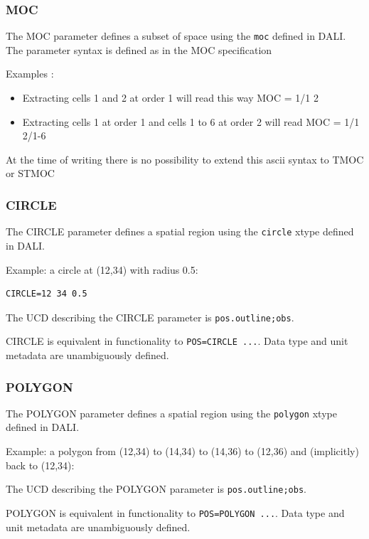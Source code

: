 \documentclass[11pt,a4paper]{ivoa}
\newcommand{\xtype}[1]{\texttt{#1}}
\newcommand{\ucd}[1]{\texttt{#1}}
\begin{document}
\subsubsection{MOC}
The MOC parameter defines a subset of space using the \xtype{moc} defined in DALI. The parameter syntax is defined as in the MOC specification \citep{MOC2}

Examples :
\begin{itemize}

\item Extracting cells 1 and 2 at order 1 will read this way MOC = 1/1 2
\item Extracting cells 1 at order 1 and cells 1 to 6 at order 2 will read MOC = 1/1 2/1-6

\end{itemize}


At the time of writing there is no possibility to extend this ascii syntax to TMOC or STMOC

\subsubsection{CIRCLE} 
\label{sec:CIRCLE}

The CIRCLE parameter defines a spatial region using the \xtype{circle}
xtype defined in DALI.

Example: a circle at (12,34) with radius 0.5:

\begin{lstlisting}
CIRCLE=12 34 0.5
\end{lstlisting}

The UCD describing the CIRCLE parameter is
\ucd{pos.outline;obs}.

CIRCLE is equivalent in functionality  to \texttt{POS=CIRCLE ...}.  Data type  and unit metadata are unambiguously defined.

\subsubsection{POLYGON}
\label{sec:POLYGON}

The POLYGON parameter defines a spatial region using the \xtype{polygon}
xtype defined in DALI.

Example: a  polygon from (12,34) to (14,34) to (14,36) to (12,36) and
(implicitly) back to (12,34):


The UCD describing the POLYGON parameter is
\ucd{pos.outline;obs}.

POLYGON is equivalent in functionality to \texttt{POS=POLYGON ...}.  Data type  and unit metadata are unambiguously defined.
\end{document}
